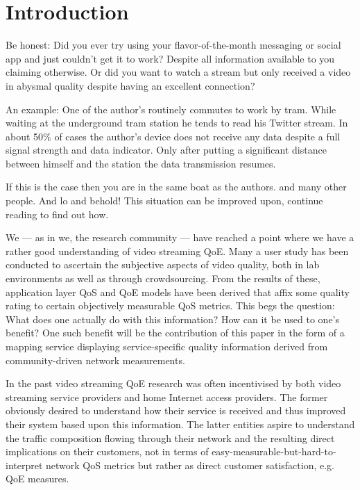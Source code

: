 \section{Introduction}
\label{sec:introduction}

Be honest: Did you ever try using your flavor-of-the-month messaging or
social app and just couldn't get it to work? Despite all information
available to you claiming otherwise. Or did you want to watch a stream
but only received a video in abysmal quality despite having an excellent
connection?

An example: One of the author's routinely commutes to work by tram.
While waiting at the underground tram station he tends to read his
Twitter stream. In about 50\% of cases the author's device does not
receive any data despite a full signal strength and data indicator. Only
after putting a significant distance between himself and the station the
data transmission resumes.

If this is the case then you are in the same boat as the authors. and
many other people. And lo and behold! This situation can be improved
upon, continue reading to find out how.

We --- as in we, the research community --- have reached a point where we have a rather good understanding of video streaming \gls{QoE}. Many a user study has been conducted to ascertain the subjective aspects of video quality, both in lab environments as well as through crowdsourcing. From the results of these, application layer \gls{QoS} and \gls{QoE} models have been derived that affix some quality rating to certain objectively measurable \gls{QoS} metrics. This begs the question: What does one actually do with this information? How can it be used to one's benefit? One such benefit will be the contribution of this paper in the form of a mapping service displaying service-specific quality information derived from community-driven network measurements.

In the past video streaming \gls{QoE} research was often incentivised by both video streaming service providers and home Internet access providers. The former obviously desired to understand how their service is received and thus improved their system based upon this information. The latter entities aspire to understand the traffic composition flowing through their network and the resulting direct implications on their customers, not in terms of easy-measurable-but-hard-to-interpret network \gls{QoS} metrics but rather as direct customer satisfaction, e.g. \gls{QoE} measures.

